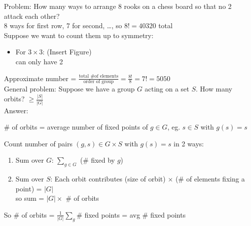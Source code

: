 Problem: How many ways to arrange 8 rooks on a chess board so that no 2 attack each other? \\
8 ways for first row, 7 for second, \ldots, so $8! = 40320$ total \\
Suppose we want to count them up to symmetry: 
\begin{itemize}
    \item For $3 \times 3$: (Insert Figure) \\
    can only have 2
\end{itemize}
Approximate number = $\frac{\text{total \# of elements}}{\text{order of group}} = \frac{8!}{8} = 7!=5050$ \\

\noindent
General problem: Suppose we have a group $G$ acting on a set $S$. How many orbits? $\ge \frac{|S|}{|G|}$ \\
Answer: 

\begin{lemma}
    \# of orbits = average number of fixed points of $g \in G$, eg. $s \in S$ with $g(s)=s$    
\end{lemma}

\begin{pf}
    Count number of pairs $(g,s) \in G \times S$ with $g(s)=s$ in 2 ways: 
    \begin{enumerate}
        \item Sum over $G$: $\sum_{g \in G}$ (\# fixed by $g$) 
        \item Sum over $S$: Each orbit contributes (size of orbit) $\times$ (\# of elements fixing a point) = $|G|$ \\
        so sum = $|G| \times $ \# of orbits
    \end{enumerate}
    So \# of orbits = $\frac{1}{|G|} \sum_{g}$\# fixed points = avg \# fixed points 
\end{pf}

